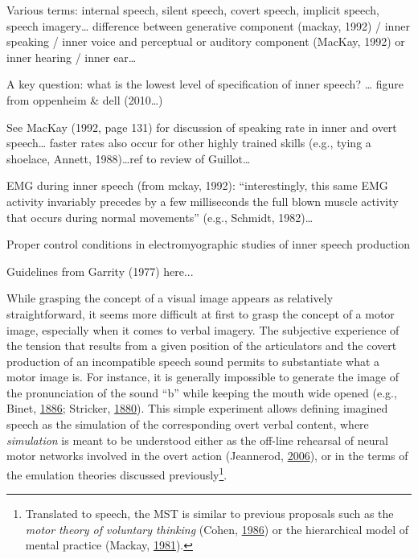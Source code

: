 \documentclass[a4paper,12pt,twoside,openright,oldfontcommands]{memoir}
\let\rmarkdownfootnote\footnote%
\def\footnote{\protect\rmarkdownfootnote}
\begin{document}
Various terms: internal speech, silent speech, covert speech, implicit speech, speech imagery\ldots{} difference between generative component (mackay, 1992) / inner speaking / inner voice and perceptual or auditory component (MacKay, 1992) or inner hearing / inner ear\ldots{}

A key question: what is the lowest level of specification of inner speech? \ldots{} figure from oppenheim \& dell (2010\ldots)

See MacKay (1992, page 131) for discussion of speaking rate in inner and overt speech\ldots{} faster rates also occur for other highly trained skills (e.g., tying a shoelace, Annett, 1988)\ldots ref to review of Guillot\ldots{}

EMG during inner speech (from mckay, 1992): \enquote{interestingly, this same EMG activity invariably precedes by a few milliseconds the full blown muscle activity that occurs during normal movements} (e.g., Schmidt, 1982)\ldots{}

\vspace{2mm}

\begin{mybox}[label = garrity]{Proper control conditions in electromyographic studies of inner speech production}

Guidelines from Garrity (1977) here...

\end{mybox}

While grasping the concept of a visual image appears as relatively straightforward, it seems more difficult at first to grasp the concept of a motor image, especially when it comes to verbal imagery. The subjective experience of the tension that results from a given position of the articulators and the covert production of an incompatible speech sound permits to substantiate what a motor image is. For instance, it is generally impossible to generate the image of the pronunciation of the sound \enquote{b} while keeping the mouth wide opened (e.g., Binet, \protect\hyperlink{ref-binet_psychologie_1886}{1886}; Stricker, \protect\hyperlink{ref-stricker_studien_1880}{1880}). This simple experiment allows defining imagined speech as the simulation of the corresponding overt verbal content, where \emph{simulation} is meant to be understood either as the off-line rehearsal of neural motor networks involved in the overt action (Jeannerod, \protect\hyperlink{ref-jeannerod_motor_2006}{2006}), or in the terms of the emulation theories discussed previously\footnote{Translated to speech, the MST is similar to previous proposals such as the \emph{motor theory of voluntary thinking} (Cohen, \protect\hyperlink{ref-cohen_motor_1986}{1986}) or the hierarchical model of mental practice (Mackay, \protect\hyperlink{ref-mackay_problem_1981}{1981}).}.
\end{document}
